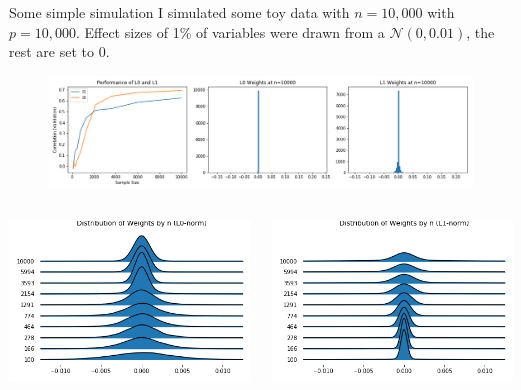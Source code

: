 \documentclass{beamer}
\begin{document}
\begin{frame}[t]{Some simple simulation}
  I simulated some toy data with $n = 10,000$ with $p = 10,000$. 
  Effect sizes of 1\% of variables were drawn from a $\mathcal{N}(0, 0.01)$, the rest are set to 0.

  \begin{figure}[htpb]
    \centering
    \includegraphics[width=0.99\linewidth]{./performance.png}
  \end{figure}
  \begin{columns}
    \begin{column}{0.35\textwidth}
      \includegraphics[width=0.99\linewidth]{./joyplot_l0.png}
    \end{column}
    \begin{column}{0.35\textwidth}
      \includegraphics[width=0.99\linewidth]{./joyplot_l1.png}

\end{column}
\end{columns}
\end{frame}
\end{document}
